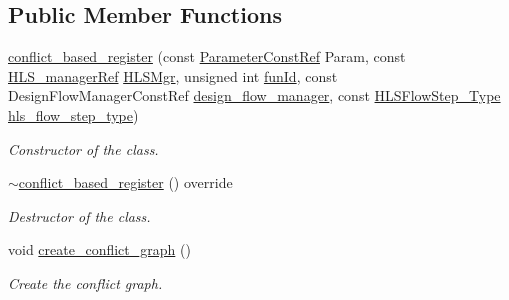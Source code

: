 \subsection*{Public Member Functions}
\begin{DoxyCompactItemize}
\item 
\hyperlink{classconflict__based__register_a435663400dc42783544165ab9b225e5a}{conflict\+\_\+based\+\_\+register} (const \hyperlink{Parameter_8hpp_a37841774a6fcb479b597fdf8955eb4ea}{Parameter\+Const\+Ref} Param, const \hyperlink{hls__manager_8hpp_acd3842b8589fe52c08fc0b2fcc813bfe}{H\+L\+S\+\_\+manager\+Ref} \hyperlink{classHLS__step_ade85003a99d34134418451ddc46a18e9}{H\+L\+S\+Mgr}, unsigned int \hyperlink{classHLSFunctionStep_a3e6434fd86c698b0c70520b859bff5b0}{fun\+Id}, const Design\+Flow\+Manager\+Const\+Ref \hyperlink{classDesignFlowStep_ab770677ddf087613add30024e16a5554}{design\+\_\+flow\+\_\+manager}, const \hyperlink{hls__step_8hpp_ada16bc22905016180e26fc7e39537f8d}{H\+L\+S\+Flow\+Step\+\_\+\+Type} \hyperlink{classHLS__step_aefd59af15346ec3f10bf12bd756e6777}{hls\+\_\+flow\+\_\+step\+\_\+type})
\begin{DoxyCompactList}\small\item\em Constructor of the class. \end{DoxyCompactList}\item 
\hyperlink{classconflict__based__register_a27c2512b494cf700ad195e96291c8cc7}{$\sim$conflict\+\_\+based\+\_\+register} () override
\begin{DoxyCompactList}\small\item\em Destructor of the class. \end{DoxyCompactList}\item 
void \hyperlink{classconflict__based__register_af30a10c52d9bda402b67284972e9d2a4}{create\+\_\+conflict\+\_\+graph} ()
\begin{DoxyCompactList}\small\item\em Create the conflict graph. \end{DoxyCompactList}\end{DoxyCompactItemize}
